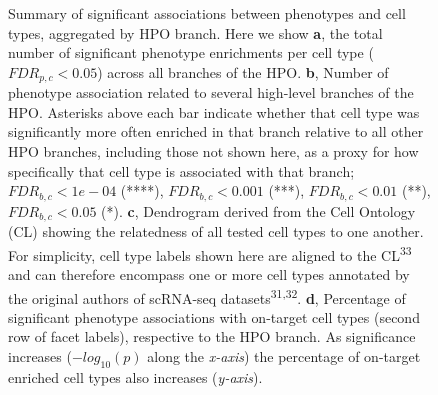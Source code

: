 \documentclass[
sn-nature
]{sn-jnl}
\begin{document}
\label{cell-fig-summary}
\begin{figure}[H]


\caption{\label{fig-summary}Summary of significant associations between
phenotypes and cell types, aggregated by HPO branch. Here we show
\textbf{a}, the total number of significant phenotype enrichments per
cell type (\(FDR_{p,c}<0.05\)) across all branches of the HPO.
\textbf{b}, Number of phenotype association related to several
high-level branches of the HPO. Asterisks above each bar indicate
whether that cell type was significantly more often enriched in that
branch relative to all other HPO branches, including those not shown
here, as a proxy for how specifically that cell type is associated with
that branch; \(FDR _{b,c}<1e-04\) (****), \(FDR _{b,c}<0.001\) (***),
\(FDR_{b,c}<0.01\) (**), \(FDR _{b,c}<0.05\) (*). \textbf{c}, Dendrogram
derived from the Cell Ontology (CL) showing the relatedness of all
tested cell types to one another. For simplicity, cell type labels shown
here are aligned to the CL\textsuperscript{33} and can therefore
encompass one or more cell types annotated by the original authors of
scRNA-seq datasets\textsuperscript{31,32}. \textbf{d}, Percentage of
significant phenotype associations with on-target cell types (second row
of facet labels), respective to the HPO branch. As significance
increases (\(-log_{10}(p)\) along the \emph{x-axis}) the percentage of
on-target enriched cell types also increases (\emph{y-axis}).}

\end{figure}%
\end{document}
